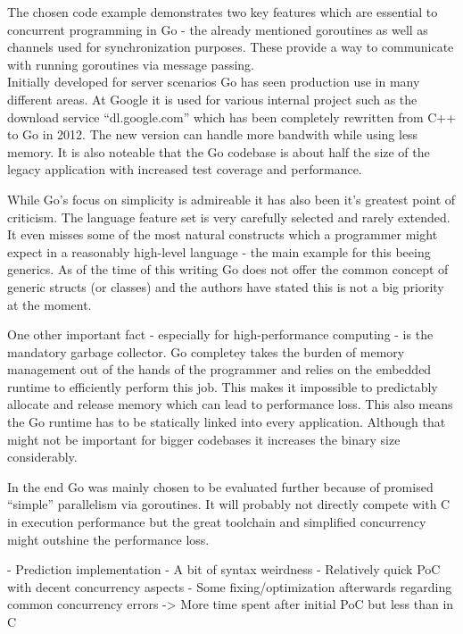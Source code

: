 The chosen code example demonstrates two key features which are essential to concurrent programming in Go - the already mentioned goroutines as well as channels used for synchronization purposes. These provide a way to communicate with running goroutines via message passing.
\\


Initially developed for server scenarios Go has seen production use in many different areas. At Google it is used for various internal project such as the download service ``dl.google.com'' which has been completely rewritten from C++ to Go in 2012. The new version can handle more bandwith while using less memory. It is also noteable that the Go codebase is about half the size of the legacy application with increased test coverage and performance.~\cite{go_dl_google}

While Go's focus on simplicity is admireable it has also been it's greatest point of criticism. The language feature set is very carefully selected and rarely extended. It even misses some of the most natural constructs which a programmer might expect in a reasonably high-level language - the main example for this beeing generics. As of the time of this writing Go does not offer the common concept of generic structs (or classes) and the authors have stated this is not a big priority at the moment.

One other important fact - especially for high-performance computing - is the mandatory garbage collector. Go completey takes the burden of memory management out of the hands of the programmer and relies on the embedded runtime to efficiently perform this job. This makes it impossible to predictably allocate and release memory which can lead to performance loss. This also means the Go runtime has to be statically linked into every application. Although that might not be important for bigger codebases it increases the binary size considerably.

In the end Go was mainly chosen to be evaluated further because of promised ``simple'' parallelism via goroutines. It will probably not directly compete with C in execution performance but the great toolchain and simplified concurrency might outshine the performance loss.

- Prediction implementation
    - A bit of syntax weirdness
    - Relatively quick PoC with decent concurrency aspects
    - Some fixing/optimization afterwards regarding common concurrency errors
    -> More time spent after initial PoC but less than in C


